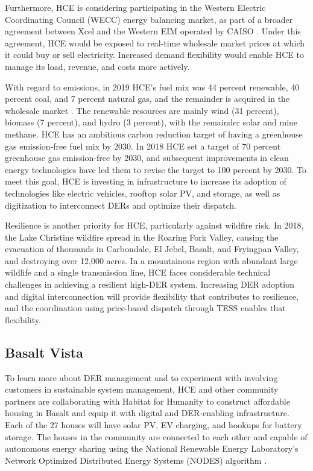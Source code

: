 Furthermore, HCE is considering participating in the Western Electric Coordinating Council (WECC) energy balancing market, as part of a broader agreement between Xcel and the Western EIM operated by CAISO \citep{CAISO2020}. Under this agreement, HCE would be exposed to real-time wholesale market prices at which it could buy or sell electricity. Increased demand flexibility would enable HCE to manage its load, revenue, and costs more actively.

With regard to emissions, in 2019 HCE's fuel mix was 44 percent renewable, 40 percent coal, and 7 percent natural gas, and the remainder is acquired in the wholesale market \citep{HCE2019}. The renewable resources are mainly wind (31 percent), biomass (7 percent), and hydro (3 percent), with the remainder solar and mine methane. HCE has an ambitious carbon reduction target of having a greenhouse gas emission-free fuel mix by 2030. In 2018 HCE set a target of 70 percent greenhouse gas emission-free by 2030, and subsequent improvements in clean energy technologies have led them to revise the target to 100 percent by 2030. To meet this goal, HCE is investing in infrastructure to increase its adoption of technologies like electric vehicles, rooftop solar PV, and storage, as well as digitization to interconnect DERs and optimize their dispatch. 

Resilience is another priority for HCE, particularly against wildfire risk. In 2018, the Lake Christine wildfire spread in the Roaring Fork Valley, causing the evacuation of thousands in Carbondale, El Jebel, Basalt, and Fryingpan Valley, and destroying over 12,000 acres. In a mountainous region with abundant large wildlife and a single transmission line, HCE faces considerable technical challenges in achieving a resilient high-DER system. Increasing DER adoption and digital interconnection will provide flexibility that contributes to resilience, and the coordination using price-based dispatch through TESS enables that flexibility.

\subsection{Basalt Vista}\label{sec:Basalt}

To learn more about DER management and to experiment with involving customers in sustainable system management, HCE and other community partners are collaborating with Habitat for Humanity to construct affordable housing in Basalt and equip it with digital and DER-enabling infrastructure. Each of the 27 houses will have solar PV, EV charging, and hookups for battery storage. The houses in the community are connected to each other and capable of autonomous energy sharing using the National Renewable Energy Laboratory's Network Optimized Distributed Energy Systems (NODES) algorithm \citep{IEEESpectrumNREL}. 

